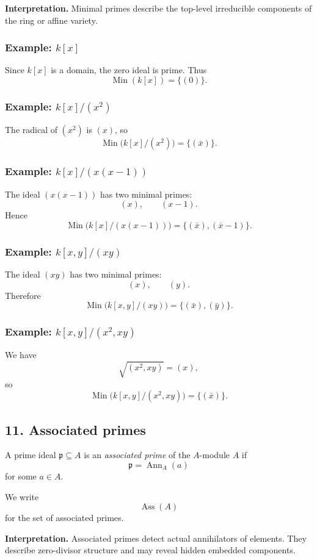 \documentclass[12pt,a4paper,oneside]{report}
\DeclareMathOperator{\Ass}{Ass}
\DeclareMathOperator{\Ann}{Ann}
\DeclareMathOperator{\Min}{Min}
\theoremstyle{notespace}
\begin{document}
	\medskip
	
	\noindent
	\textbf{Interpretation.}
	Minimal primes describe the top-level irreducible components of the ring or affine variety.
	
	\subsubsection{Example: \(k[x]\)}
	Since \(k[x]\) is a domain, the zero ideal is prime. Thus
	\[
	\Min(k[x])=\{(0)\}.
	\]
	
	\subsubsection{Example: \(k[x]/(x^2)\)}
	The radical of \((x^2)\) is \((x)\), so
	\[
	\Min\bigl(k[x]/(x^2)\bigr)=\{(\bar x)\}.
	\]
	
	\subsubsection{Example: \(k[x]/(x(x-1))\)}
	The ideal \((x(x-1))\) has two minimal primes:
	\[
	(x),\qquad (x-1).
	\]
	Hence
	\[
	\Min\bigl(k[x]/(x(x-1))\bigr)=\{(\bar x),(\bar x-1)\}.
	\]
	
	\subsubsection{Example: \(k[x,y]/(xy)\)}
	The ideal \((xy)\) has two minimal primes:
	\[
	(x),\qquad (y).
	\]
	Therefore
	\[
	\Min\bigl(k[x,y]/(xy)\bigr)=\{(\bar x),(\bar y)\}.
	\]
	
	\subsubsection{Example: \(k[x,y]/(x^2,xy)\)}
	We have
	\[
	\sqrt{(x^2,xy)}=(x),
	\]
	so
	\[
	\Min\bigl(k[x,y]/(x^2,xy)\bigr)=\{(\bar x)\}.
	\]
	
	\subsection{11. Associated primes}
	
	A prime ideal \(\mathfrak p\subseteq A\) is an \emph{associated prime} of the \(A\)-module \(A\) if
	\[
	\mathfrak p=\Ann_A(a)
	\]
	for some \(a\in A\).
	
	We write
	\[
	\Ass(A)
	\]
	for the set of associated primes.
	
	\medskip
	
	\noindent
	\textbf{Interpretation.}
	Associated primes detect actual annihilators of elements. They describe zero-divisor structure and may reveal hidden embedded components.
	
\end{document}
